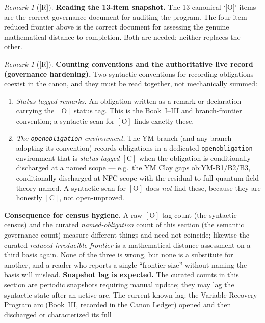 \documentclass[12pt,oneside]{amsbook}
\theoremstyle{plain}
\theoremstyle{definition}
\theoremstyle{remark}
\newtheorem{remark}[theorem]{Remark}
\newcommand{\status}[1]{\textup{[#1]}}
\begin{document}
\begin{remark}[\status{R}]
\textbf{Reading the 13-item snapshot.}
The 13 canonical `[O]' items are the correct governance document for
auditing the program.  The four-item reduced frontier above is the
correct document for assessing the genuine mathematical distance to
completion.  Both are needed; neither replaces the other.
\end{remark}

\begin{remark}[\status{R}]\label{rem:obligation-conventions}
\textbf{Counting conventions and the authoritative live record
(governance hardening).}
Two syntactic conventions for recording obligations coexist in the
canon, and they must be read together, not mechanically summed:
\begin{enumerate}[label=\textup{(\roman*)}]
  \item \emph{Status-tagged remarks.}  An obligation written as a
    remark or declaration carrying the $[\mathrm{O}]$ status tag.
    This is the Book~I--III and branch-frontier convention; a
    syntactic scan for $[\mathrm{O}]$ finds exactly these.
  \item \emph{The \texttt{openobligation} environment.}  The YM
    branch (and any branch adopting its convention) records
    obligations in a dedicated \texttt{openobligation} environment
    that is \emph{status-tagged} $[\mathrm{C}]$ when the obligation
    is conditionally discharged at a named scope --- e.g.\ the YM
    Clay gaps ob:YM-B1/B2/B3, conditionally discharged at NFC
    scope with the residual to full quantum field theory named.
    A syntactic scan for $[\mathrm{O}]$ does \emph{not} find these,
    because they are honestly $[\mathrm{C}]$, not open-unproved.
\end{enumerate}
\textbf{Consequence for census hygiene.}  A raw $[\mathrm{O}]$-tag
count (the syntactic census) and the curated \emph{named-obligation}
count of this section (the semantic governance count) measure
different things and need not coincide; likewise the curated
\emph{reduced irreducible frontier} is a mathematical-distance
assessment on a third basis again.  None of the three is wrong, but
none is a substitute for another, and a reader who reports a single
``frontier size'' without naming the basis will mislead.
\textbf{Snapshot lag is expected.}  The curated counts in this
section are periodic snapshots requiring manual update; they may lag
the syntactic state after an active arc.  The current known lag: the
Variable Recovery Program arc (Book~III, recorded in the Canon
Ledger) opened and then discharged or characterized its full

\end{remark}
\end{document}
